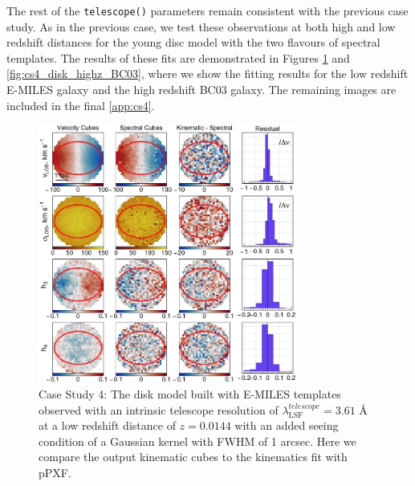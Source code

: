 \documentclass[
  journal=pasa,
  manuscript=research-paper, %
  year=2020,
  volume=37,
]{cup-journal}
\newcommand{\telescope}[1]{\texttt{telescope()}#1}
\begin{document}
The rest of the \telescope{} parameters remain consistent with the previous case study. 
As in the previous case, we test these observations at both high and low redshift distances for the young disc model with the two flavours of spectral templates.
The results of these fits are demonstrated in Figures \ref{fig:cs4_disk_lowz_E-MILES} and \ref{fig:cs4_disk_highz_BC03}, where we show the fitting results for the low redshift E-MILES galaxy and the high redshift BC03 galaxy. 
The remaining images are included in the final \ref{app:cs4}.

\begin{figure}
    \centering
    \includegraphics[keepaspectratio, width=8.5cm]{cs4_disk_velocities_lowz_fwhm_blur_EMILES.jpeg}
    \caption{Case Study 4: The disk model built with E-MILES templates observed with an intrinsic telescope resolution of  $\lambda_{\text{LSF}}^{telescope} = 3.61$ \AA{} at a low redshift distance of $z = 0.0144$ with an added seeing condition of a Gaussian kernel with FWHM of 1 arcsec. Here we compare the output kinematic cubes to the kinematics fit with pPXF.}
    \label{fig:cs4_disk_lowz_E-MILES}
\end{figure}
\end{document}
